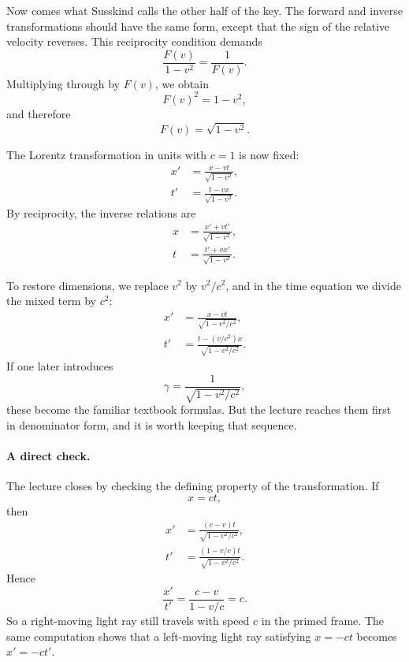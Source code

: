 Now comes what Susskind calls the other half of the key. The forward and inverse transformations should have the same form, except that the sign of the relative velocity reverses. This reciprocity condition demands
\begin{equation}
\frac{F(v)}{1-v^2}=\frac{1}{F(v)}.
\end{equation}
Multiplying through by \(F(v)\), we obtain
\begin{equation}
F(v)^2=1-v^2,
\end{equation}
and therefore
\begin{equation}
F(v)=\sqrt{1-v^2}.
\end{equation}

The Lorentz transformation in units with \(c=1\) is now fixed:
\begin{align}
x' &= \frac{x-vt}{\sqrt{1-v^2}}, \\
t' &= \frac{t-vx}{\sqrt{1-v^2}}.
\end{align}
By reciprocity, the inverse relations are
\begin{align}
x &= \frac{x'+vt'}{\sqrt{1-v^2}}, \\
t &= \frac{t'+vx'}{\sqrt{1-v^2}}.
\end{align}

To restore dimensions, we replace \(v^2\) by \(v^2/c^2\), and in the time equation we divide the mixed term by \(c^2\):
\begin{align}
x' &= \frac{x-vt}{\sqrt{1-v^2/c^2}}, \\
t' &= \frac{t-(v/c^2)x}{\sqrt{1-v^2/c^2}}.
\end{align}
If one later introduces
\begin{equation}
\gamma=\frac{1}{\sqrt{1-v^2/c^2}},
\end{equation}
these become the familiar textbook formulas. But the lecture reaches them first in denominator form, and it is worth keeping that sequence.

\paragraph{A direct check.} The lecture closes by checking the defining property of the transformation. If
\begin{equation}
x=ct,
\end{equation}
then
\begin{align}
x' &= \frac{(c-v)t}{\sqrt{1-v^2/c^2}}, \\
t' &= \frac{(1-v/c)t}{\sqrt{1-v^2/c^2}}.
\end{align}
Hence
\begin{equation}
\frac{x'}{t'}=\frac{c-v}{1-v/c}=c.
\end{equation}
So a right-moving light ray still travels with speed \(c\) in the primed frame. The same computation shows that a left-moving light ray satisfying \(x=-ct\) becomes \(x'=-ct'\).

